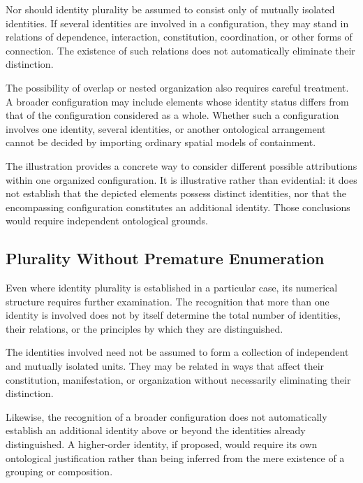 Nor should identity plurality be assumed to consist
only of mutually isolated identities. If several identities
are involved in a configuration, they may stand in relations
of dependence, interaction, constitution, coordination,
or other forms of connection. The existence of such
relations does not automatically eliminate their distinction.

The possibility of overlap or nested organization also
requires careful treatment. A broader configuration may
include elements whose identity status differs from that
of the configuration considered as a whole. Whether
such a configuration involves one identity, several
identities, or another ontological arrangement cannot
be decided by importing ordinary spatial models of
containment.



The illustration provides a concrete way to consider
different possible attributions within one organized
configuration. It is illustrative rather than evidential:
it does not establish that the depicted elements possess
distinct identities, nor that the encompassing configuration
constitutes an additional identity. Those conclusions
would require independent ontological grounds.

\subsection{Plurality Without Premature Enumeration}

Even where identity plurality is established in a particular
case, its numerical structure requires further examination.
The recognition that more than one identity is involved
does not by itself determine the total number of identities,
their relations, or the principles by which they are
distinguished.

The identities involved need not be assumed to form
a collection of independent and mutually isolated units.
They may be related in ways that affect their constitution,
manifestation, or organization without necessarily
eliminating their distinction.

Likewise, the recognition of a broader configuration
does not automatically establish an additional identity
above or beyond the identities already distinguished.
A higher-order identity, if proposed, would require
its own ontological justification rather than being
inferred from the mere existence of a grouping or
composition.

